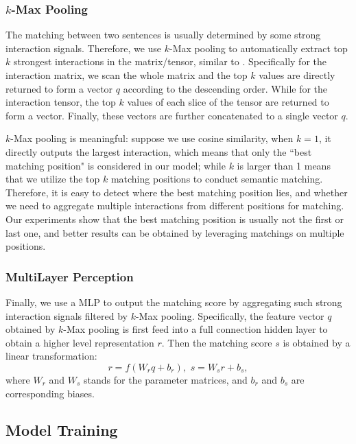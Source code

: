 \documentclass[letterpaper]{article}
\begin{document}
\subsubsection{$k$-Max Pooling}
The matching between two sentences is usually determined by some strong interaction signals. Therefore, we use $k$-Max pooling to automatically extract top $k$ strongest interactions in the matrix/tensor, similar to \cite{KalchbrennerACL2014}. Specifically for the interaction matrix, we scan the whole matrix and the top $k$ values are directly returned to form a vector $q$ according to the descending order. While for the interaction tensor, the top $k$ values of each slice of the tensor are returned to form a vector. Finally, these vectors are further concatenated to a single vector $q$.

$k$-Max pooling is meaningful: suppose we use cosine similarity, when $k=1$, it directly outputs the largest interaction, which means that only the ``best matching position" is considered in our model; while $k$ is larger than 1 means that we utilize the top $k$ matching positions to conduct semantic matching. Therefore, it is easy to detect where the best matching position lies, and whether we need to aggregate multiple interactions from different positions for matching. Our experiments show that the best matching position is usually not the first or last one, and better results can be obtained by leveraging matchings on multiple positions.

\subsubsection{MultiLayer Perception}

Finally, we use a MLP to output the matching score by aggregating such strong interaction signals filtered by $k$-Max pooling. Specifically, the feature vector $q$ obtained by $k$-Max pooling is first feed into a full connection hidden layer to obtain a higher level representation $r$. Then the matching score $s$ is obtained by a linear transformation:
\begin{equation*}
r= f(W_rq+b_r),\,\,s=W_sr+b_s,
\end{equation*}
where $W_r$ and $W_s$ stands for the parameter matrices, and $b_r$ and $b_s$ are corresponding biases.

\subsection{Model Training}
\end{document}

